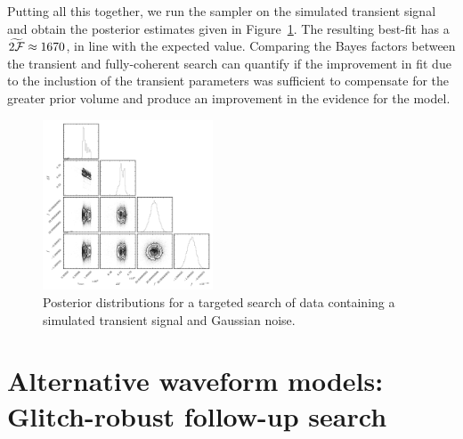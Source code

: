 \documentclass[aps, prd, twocolumn, superscriptaddress, floatfix, showpacs, nofootinbib, longbibliography]{revtex4-1}
\begin{document}
Putting all this together, we run the sampler on the
simulated transient signal and obtain the posterior estimates given in
Figure~\ref{fig_transient_posterior}. The resulting best-fit has a
$\widetilde{2{\mathcal{F}}}\approx 1670$, in line with the expected value. Comparing the
Bayes factors between the transient and fully-coherent search can quantify if
the improvement in fit due to the inclustion of the transient parameters was
sufficient to compensate for the greater prior volume and produce an
improvement in the evidence for the model.

\begin{figure}[htb]
\centering
\includegraphics[width=0.45\textwidth]{transient_search_corner}
\caption{Posterior distributions for a targeted search of data containing
a simulated transient signal and Gaussian noise.}
\label{fig_transient_posterior}
\end{figure}



\section{Alternative waveform models: Glitch-robust follow-up search}
\label{sec_glitches}
\end{document}
